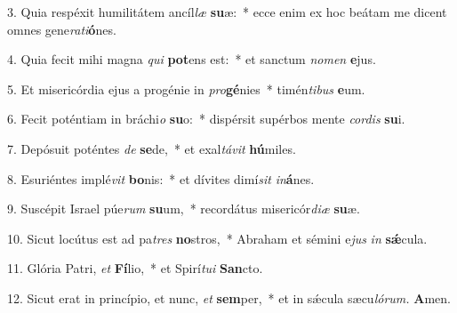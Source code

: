 \item 3. Quia respéxit humilitátem ancíl\hspace{0.03em}\textit{læ} \textbf{su}æ:~* ecce enim ex hoc beátam me dicent omnes gene\textit{rati}\textbf{ó}nes.
\item 4. Quia fecit mihi magna \textit{qui} \textbf{pot}ens est:~* et san\-ctum \textit{nomen} \textbf{e}jus.
\item 5. Et misericórdia ejus a progénie in \textit{pro}\hspace{0.03em}\textbf{gé}nies~* timén\textit{tibus} \textbf{e}um.
\item 6. Fecit poténtiam in bráchi\textit{o} \textbf{su}o:~* dispérsit supérbos mente \textit{cordis} \textbf{su}i.
\item 7. Depósuit poténtes \textit{de} \textbf{se}de,~* et exal\textit{távit} \textbf{hú}miles.
\item 8. Esuriéntes implé\textit{vit} \textbf{bo}nis:~* et dívites dimí\textit{sit} \textit{in}\textbf{á}nes.
\item 9. Suscépit Israel púe\textit{rum} \textbf{su}um,~* recordátus misericór\textit{diæ} \textbf{su}æ.
\item 10. Sicut locútus est ad pa\hspace{0.03em}\textit{tres} \textbf{no}stros,~* Abraham et sémini e\textit{jus} \textit{in} \textbf{sǽ}cula.
\item 11. Glória Patri, \textit{et} \textbf{Fí}lio,~* et Spirí\hspace{0.03em}\textit{tui} \textbf{San}cto.
\item 12. Sicut erat in princípio, et nunc, \textit{et} \textbf{sem}per,~* et in sǽcula sæcu\hspace{0.03em}\textit{lórum.} \textbf{A}men.

